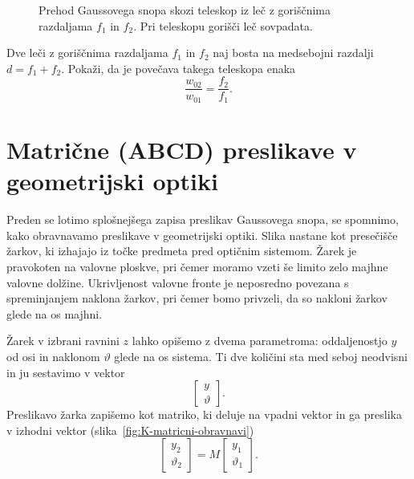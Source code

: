 \begin{figure}[h]
\def\svgwidth{145truemm} 

\caption{Prehod Gaussovega snopa
skozi teleskop iz leč z goriščnima razdaljama $f_{1}$ in $f_{2}$. Pri teleskopu
gorišči leč sovpadata.}
\label{fig:Prehod-Gaussovega-snopa-teleskop}
\end{figure}

\begin{definition}
\label{teleskop}
Dve leči z goriščnima razdaljama $f_{1}$ in $f_{2}$ naj bosta na medsebojni
razdalji $d=f_{1}+f_{2}$. Pokaži, da je povečava takega teleskopa enaka  
\begin{equation}
\frac{w_{02}}{w_{01}}=\frac{f_{2}}{f_{1}}.
\label{eq:povecava-teleskop}
\end{equation}
\end{definition}

\section{Matrične (ABCD) preslikave v geometrijski optiki}

Preden se lotimo splošnejšega zapisa preslikav Gaussovega snopa, 
se spomnimo, kako obravnavamo preslikave v geometrijski optiki. 
Slika nastane kot presečišče žarkov,
ki izhajajo iz točke predmeta pred optičnim sistemom. Žarek 
je pravokoten na valovne ploskve, pri čemer moramo vzeti še limito zelo majhne
valovne dolžine. Ukrivljenost valovne fronte je neposredno
povezana s spreminjanjem naklona žarkov, pri čemer bomo privzeli, da so 
nakloni žarkov glede na os majhni.

Žarek v izbrani ravnini $z$ lahko opišemo z dvema parametroma: 
oddaljenostjo $y$ od osi in naklonom $\vartheta$ glede na os sistema. Ti dve količini 
sta med seboj neodvisni in ju sestavimo 
v vektor
\begin{equation}
\left[\begin{array}{c}
y\\
\vartheta
\end{array}\right].
\end{equation}
Preslikavo žarka zapišemo kot matriko, ki deluje na vpadni vektor in ga preslika
v izhodni vektor (slika~\ref{fig:K-matricni-obravnavi})
\begin{equation}
\left[\begin{array}{c}
y_2\\
\vartheta_2
\end{array}\right] = M \left[\begin{array}{c}
y_1\\
\vartheta_1
\end{array}\right].
\end{equation}

